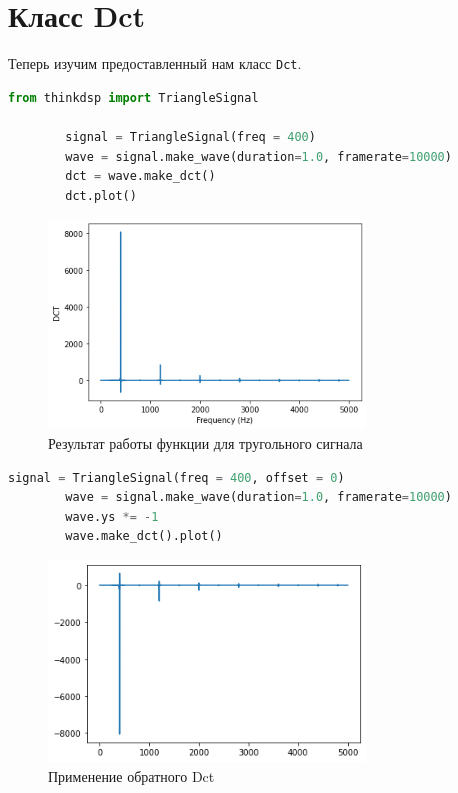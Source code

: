\documentclass[a4paper, 12pt]{report}
\begin{document}
	\chapter{Класс Dct}
	Теперь изучим предоставленный нам класс \texttt{Dct}.
	\begin{lstlisting}[language=Python,caption=Применение этого класса]
		from thinkdsp import TriangleSignal

		signal = TriangleSignal(freq = 400)
		wave = signal.make_wave(duration=1.0, framerate=10000)
		dct = wave.make_dct()
		dct.plot()
	\end{lstlisting}
	\begin{figure}[H]
		\centering
		\includegraphics[width=0.75\textwidth]{dct1.png}
		\caption{Результат работы функции для тругольного сигнала}
		\label{fig:dct1}
	\end{figure}
	\begin{lstlisting}[language=Python,caption=Обратный Dct]
		signal = TriangleSignal(freq = 400, offset = 0)
		wave = signal.make_wave(duration=1.0, framerate=10000)
		wave.ys *= -1
		wave.make_dct().plot()
	\end{lstlisting}
	\begin{figure}[H]
		\centering
		\includegraphics[width=0.75\textwidth]{dct2.png}
		\caption{Применение обратного Dct}
		\label{fig:dct2}
	\end{figure}
	
\end{document}
